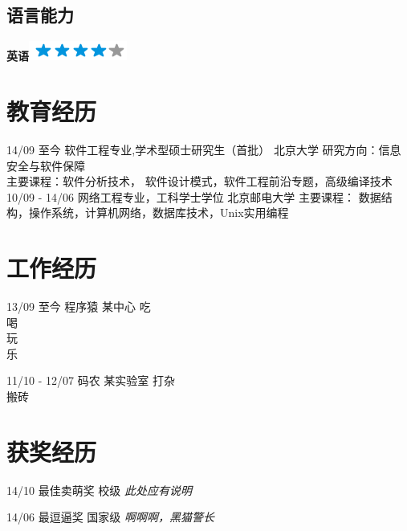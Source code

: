 \documentclass[]{friggeri-cv}
\begin{document}
\begin{aside}
  \section{语言能力}
    \textbf{英语}\includegraphics[scale=0.40]{img/4stars.png}
    ~
\end{aside}

\section{教育经历}
\begin{entrylist}
  \entry
    {14/09 至今}
    {软件工程专业,学术型硕士研究生（首批）}
    {北京大学}
    {研究方向：信息安全与软件保障\\
    主要课程：软件分析技术， 软件设计模式，软件工程前沿专题，高级编译技术\\
    }
  \entry
    {10/09 - 14/06}
    {网络工程专业，工科学士学位}
    {北京邮电大学}
    {
    主要课程： 数据结构，操作系统，计算机网络，数据库技术，Unix实用编程
    }
\end{entrylist}

\section{工作经历}
\begin{entrylist}
  \entry
    {13/09 至今 }
    {程序猿}
    {某中心}
    {吃\\
    喝\\
    玩\\
    乐\\}

  \entry
    {11/10 - 12/07}
    {码农}
    {某实验室}
    {打杂\\
    搬砖}
\end{entrylist}


\section{获奖经历}
\begin{entrylist}
  \entry
    {14/10}
    {最佳卖萌奖}
    {校级}
    {\emph{此处应有说明}\\}

  \entry
    {14/06}
    {最逗逼奖}
    {国家级}
    {\emph{啊啊啊，黑猫警长
    }}
\end{entrylist}


\newpage
\end{document}
